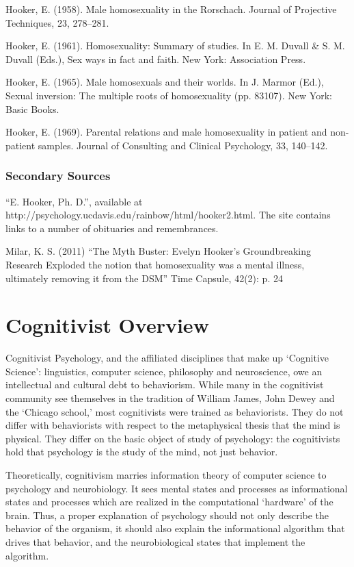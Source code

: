 \begin{refsection}
Hooker, E. (1958). Male homosexuality in the Rorschach. Journal of Projective Techniques, 23, 278--281.

Hooker, E. (1961). Homosexuality: Summary of studies. In E. M. Duvall \& S. M. Duvall (Eds.), Sex ways in fact and faith. New York: Association Press.

Hooker, E. (1965). Male homosexuals and their worlds. In J. Marmor (Ed.), Sexual inversion: The multiple roots of homosexuality (pp. 83107). New York: Basic Books.

Hooker, E. (1969). Parental relations and male homosexuality in patient and non-patient samples. Journal of Consulting and Clinical Psychology, 33, 140--142.

\subsection{Secondary Sources}
\label{secondarysources}

``E. Hooker, Ph. D.'', available at http:\slash \slash psychology.ucdavis.edu\slash rainbow\slash html\slash hooker2.html. The site contains links to a number of obituaries and remembrances.

Milar, K. S. (2011) ``The Myth Buster: Evelyn Hooker's Groundbreaking Research Exploded the notion that homosexuality was a mental illness, ultimately removing it from the DSM'' Time Capsule, 42(2): p. 24

\pagebreak 

\chapter{Cognitivist Overview}
\label{cognitivistoverview}

Cognitivist Psychology, and the affiliated disciplines that make up `Cognitive Science': linguistics, computer science, philosophy and neuroscience, owe an intellectual and cultural debt to behaviorism. While many in the cognitivist community see themselves in the tradition of William James, John Dewey and the `Chicago school,' most cognitivists were trained as behaviorists. They do not differ with behaviorists with respect to the metaphysical thesis that the mind is physical. They differ on the basic object of study of psychology: the cognitivists hold that psychology is the study of the mind, not just behavior.

Theoretically, cognitivism marries information theory of computer science to psychology and neurobiology. It sees mental states and processes as informational states and processes which are realized in the computational `hardware' of the brain. Thus, a proper explanation of psychology should not only describe the behavior of the organism, it should also explain the informational algorithm that drives that behavior, and the neurobiological states that implement the algorithm.


\end{refsection}
